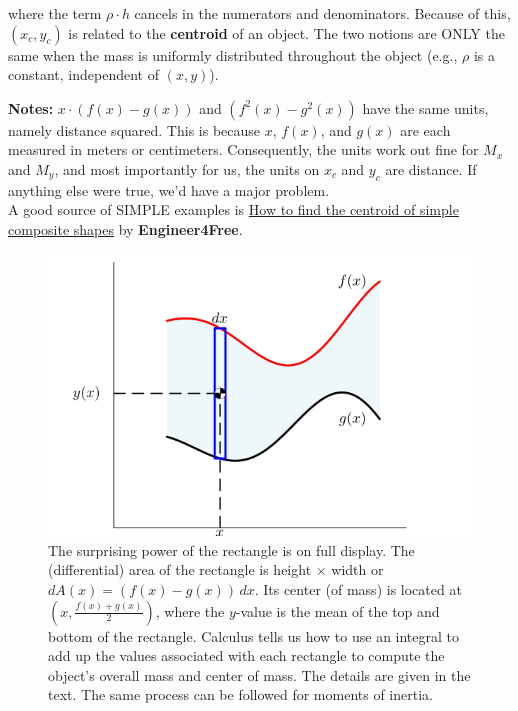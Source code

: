 \begin{tcolorbox}[colback=mylightblue, title = {\bf Center of Mass in the Plane}, breakable]
\begin{definition}
\begin{enumerate}
\end{enumerate}
where the term $\rho \cdot h $ cancels in the numerators and denominators. Because of this, $(x_c, y_c)$ is related to the \textbf{centroid} of an object. The two notions are ONLY the same when the mass is uniformly distributed throughout the object (e.g., $\rho$ is a constant, independent of $(x, y)$). 

\end{definition}

\textbf{Notes:}  $x \cdot \left( f(x)  - g(x) \right)$ and $ \left( f^2(x)  - g^2(x) \right)$ have the same units, namely distance squared. This is because $x$, $f(x)$, and $g(x)$ are each measured in meters or centimeters. Consequently, the units work out fine for $M_x$ and $M_y$, and most importantly for us, the units on $x_c$ and $y_c$ are distance. If anything else were true, we'd have a major problem. \\

A good source of SIMPLE examples is \href{https://youtu.be/5oil5x9tVhg}{How to find the centroid of simple composite shapes} by \textbf{Engineer4Free}. 

\end{tcolorbox}



\begin{figure}[htb]%
\centering
\includegraphics[width=0.75\columnwidth]{graphics/Chap03/PlanarAreaWithRectangle.png}
    \caption[]{The surprising power of the rectangle is on full display. The (differential) area of the rectangle is height $\times$ width or $dA(x) = (f(x) - g(x)) \, dx$. Its center (of mass) is located at $(x, \frac{f(x) + g(x)}{2})$, where the $y$-value is the mean of the top and bottom of the rectangle. Calculus tells us how to use an integral to add up the values associated with each rectangle to compute the object's overall mass and center of mass. The details are given in the text. The same process can be followed for moments of inertia.}
    \label{fig:CenterOfMassDerivation}
\end{figure}

